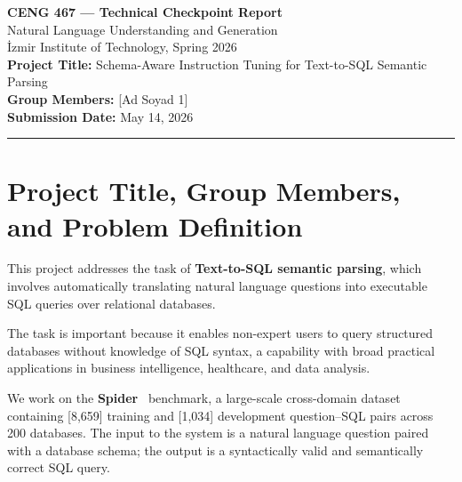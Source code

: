 \documentclass[11pt,a4paper]{article}
\begin{document}

\begin{center}
  {\LARGE\bfseries CENG 467 — Technical Checkpoint Report}\\[0.5em]
  {\large Natural Language Understanding and Generation}\\[0.3em]
  {\large İzmir Institute of Technology, Spring 2026}\\[1em]

  {\large\bfseries Project Title:}
  Schema-Aware Instruction Tuning for Text-to-SQL Semantic Parsing\\[0.3em]
  {\large\bfseries Group Members:}
  [Ad Soyad 1] \quad [Ad Soyad 2]\\[0.3em]
  {\large\bfseries Submission Date:} May 14, 2026
\end{center}

\vspace{1em}
\hrule
\vspace{1.5em}


\section{Project Title, Group Members, and Problem Definition}


This project addresses the task of \textbf{Text-to-SQL semantic parsing},
which involves automatically translating natural language questions into
executable SQL queries over relational databases.

The task is important because it enables non-expert users to query structured
databases without knowledge of SQL syntax, a capability with broad practical
applications in business intelligence, healthcare, and data analysis.

We work on the \textbf{Spider}~\cite{Yu2018Spider} benchmark, a large-scale
cross-domain dataset containing [8,659] training and [1,034] development
question–SQL pairs across 200 databases.
The input to the system is a natural language question paired with a database
schema; the output is a syntactically valid and semantically correct SQL query.
\end{document}
